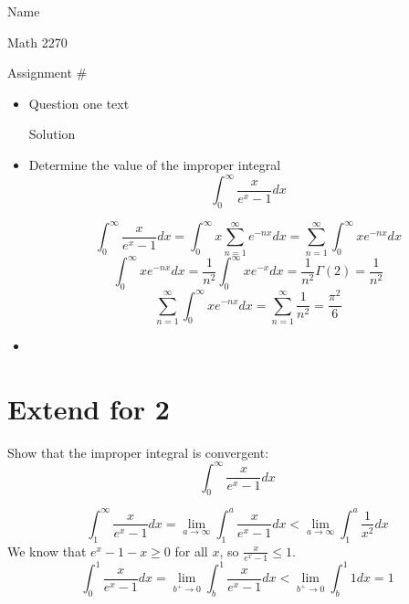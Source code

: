 \documentclass[12pt]{article}
\begin{document}
\hfill Name 

\hfill Math 2270

\hfill Assignment \#

\begin{itemize}
\item[1)] Question one text

Solution

\item[2)] Determine the value of the improper integral
\[
\int_0^{\infty}\frac{x}{e^x-1}dx
\]

\[
\int_0^{\infty}\frac{x}{e^x-1}dx
=\int_0^{\infty}x\sum_{n=1}^{\infty}e^{-nx}dx=\sum_{n=1}^{\infty}\int_0^{\infty}xe^{-nx}dx
\]
\[
\int_0^{\infty}xe^{-nx}dx=\frac{1}{n^2}\int_0^{\infty}xe^{-x}dx=\frac{1}{n^2}\Gamma(2)=\frac{1}{n^2}
\]
\[
\sum_{n=1}^{\infty}\int_0^{\infty}xe^{-nx}dx=\sum_{n=1}^{\infty}\frac{1}{n^2}=\frac{\pi^2}{6}
\]


\item[3)]

\end{itemize}

\newpage
\appendix
\section{Extend for 2}
Show that the improper integral is convergent:
\[
\int_0^{\infty}\frac{x}{e^x-1}dx
\]

\[
\int_1^{\infty}\frac{x}{e^x-1}dx=
\lim_{a\rightarrow \infty}\int_1^a\frac{x}{e^x-1}dx<\lim_{a\rightarrow \infty}\int_1^a \frac{1}{x^2}dx
\]
We know that $e^x-1-x\geq 0$ for all $x$, so $\frac{x}{e^x-1}\leq 1$.
\[
\int_0^1\frac{x}{e^x-1}dx=
\lim_{b^+\rightarrow 0}\int_b^1\frac{x}{e^x-1}dx<\lim_{b^+\rightarrow 0}\int_b^1 1dx=1
\]
\end{document}
